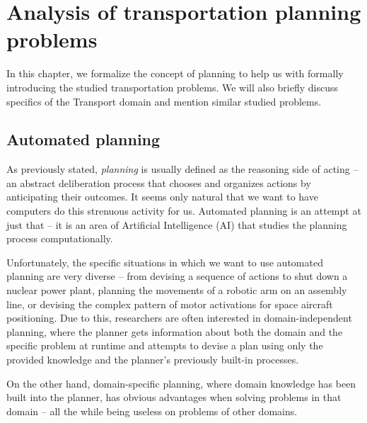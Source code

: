 \chapter{Analysis of transportation planning problems}

In this chapter, we formalize the concept of planning to help us with formally introducing the studied transportation problems. We will also briefly discuss specifics of the Transport domain and mention similar studied problems.

















\section{Automated planning}

As previously stated, \textit{planning} is usually defined as the reasoning side of acting -- an abstract deliberation
process that chooses and organizes actions by anticipating their outcomes. \citep[Section~1.1]{Ghallab2004}
It seems only natural that we want to have computers do this strenuous activity for us.
Automated planning is an attempt at just that -- it is an area of Artificial Intelligence (AI) that
studies the planning process computationally. \citep[Section~1.1]{Ghallab2004}

Unfortunately, the specific situations in which we want to use automated planning are very diverse --
from devising a sequence of actions to shut down a nuclear power plant,
planning the movements of a robotic arm
on an assembly line, or devising the complex pattern of motor activations
for space aircraft positioning.
Due to this, researchers are often interested in domain-independent planning,
where the planner gets information
about both the domain and the specific problem at runtime and attempts to devise a plan using only the provided knowledge
and the planner's previously built-in processes. \citep[Section~1.3]{Ghallab2004}

On the other hand, domain-specific planning, where domain knowledge has been built into the planner,
has obvious advantages when solving problems in that domain -- all the while being useless on problems of other
domains. \citep[Section~1.3]{Ghallab2004}

